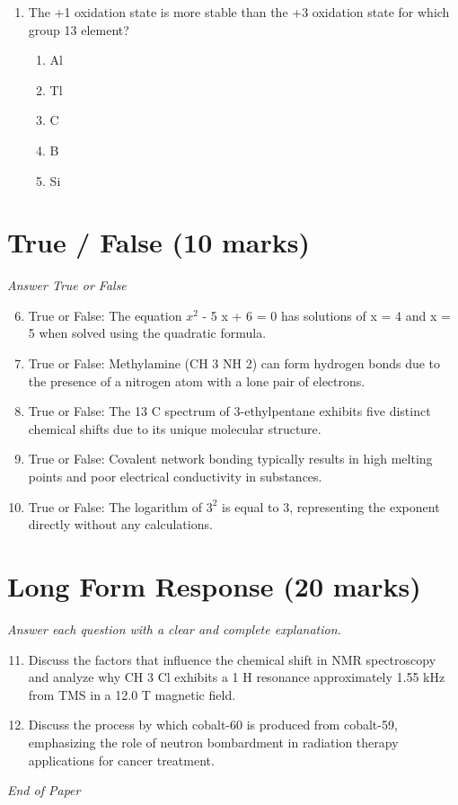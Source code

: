 \documentclass[12pt]{article}
\begin{document}
\begin{enumerate}[label=\arabic*.]
\begin{enumerate}[label=(\alph*)]
    \item $1.25 \times 10^3$ $\mathrm{K}$
    \item $1.20 \times 10^3$ $\mathrm{K}$
    \item $1.41 \times 10^3$ $\mathrm{K}$
    \item $1.10 \times 10^3$ $\mathrm{K}$
    \item $1.65 \times 10^3$ $\mathrm{K}$
\end{enumerate}
\item The +1 oxidation state is more stable than the +3 oxidation state for which group 13 element?
\begin{enumerate}[label=(\alph*)]
    \item Al
    \item Tl
    \item C
    \item B
    \item Si
\end{enumerate}
\end{enumerate}

\section*{True / False (10 marks)}
\textit{Answer True or False}
\begin{enumerate}[label=\arabic*.]
\setcounter{enumi}{5}
\item True or False: The equation $x^2$ - 5 x + 6 = 0 has solutions of x = 4 and x = 5 when solved using the quadratic formula.
\item True or False: Methylamine (CH 3 NH 2) can form hydrogen bonds due to the presence of a nitrogen atom with a lone pair of electrons.
\item True or False: The 13 C spectrum of 3-ethylpentane exhibits five distinct chemical shifts due to its unique molecular structure.
\item True or False: Covalent network bonding typically results in high melting points and poor electrical conductivity in substances.
\item True or False: The logarithm of $3^2$ is equal to 3, representing the exponent directly without any calculations.
\end{enumerate}

\section*{Long Form Response (20 marks)}
\textit{Answer each question with a clear and complete explanation.}
\begin{enumerate}[label=\arabic*.]
\setcounter{enumi}{10}
\item Discuss the factors that influence the chemical shift in NMR spectroscopy and analyze why CH 3 Cl exhibits a 1 H resonance approximately 1.55 kHz from TMS in a 12.0 T magnetic field.
\item Discuss the process by which cobalt-60 is produced from cobalt-59, emphasizing the role of neutron bombardment in radiation therapy applications for cancer treatment.
\end{enumerate}

\vfill
\noindent\textit{End of Paper}
\end{document}
